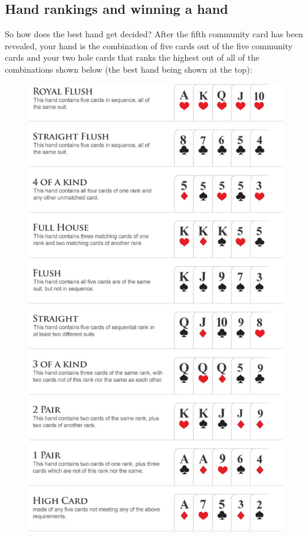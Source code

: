 \documentclass{article}
\begin{document}
\subsection{Hand rankings and winning a hand}
So how does the best hand get decided? After the fifth community card has been revealed, your hand is the combination of five cards out of the five community cards and your two hole cards that ranks the highest out of all of the combinations shown below (the best hand being shown at the top):
\begin{figure}[h]
    \centering
    \includegraphics[width=115mm]{how-to-ranking.jpg}
\end{figure}
\end{document}
